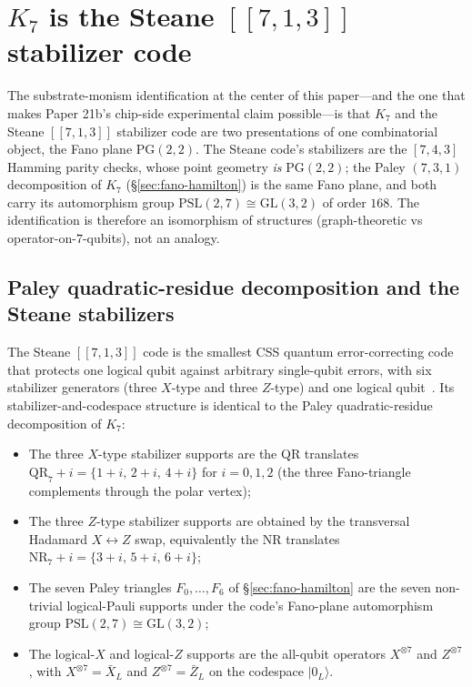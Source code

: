 \documentclass[11pt]{article}
\newcommand{\Klogical}{[[7, 1, 3]]}
\newcommand{\barX}{\bar X_L}
\newcommand{\barZ}{\bar Z_L}
\newcommand{\QR}{\mathrm{QR}}
\newcommand{\NR}{\mathrm{NR}}
\begin{document}
\section{$K_7$ is the Steane $\Klogical$ stabilizer code}
\label{sec:k7-steane}

The substrate-monism identification at the center of this paper---and the one that makes Paper 21b's chip-side experimental claim possible---is that $K_7$ and the Steane $\Klogical$ stabilizer code are two presentations of one combinatorial object, the Fano plane $\mathrm{PG}(2, 2)$.  The Steane code's stabilizers are the $[7, 4, 3]$ Hamming parity checks, whose point geometry \emph{is} $\mathrm{PG}(2, 2)$; the Paley $(7, 3, 1)$ decomposition of $K_7$ (\S\ref{sec:fano-hamilton}) is the same Fano plane, and both carry its automorphism group $\mathrm{PSL}(2, 7) \cong \mathrm{GL}(3, 2)$ of order $168$.  The identification is therefore an isomorphism of structures (graph-theoretic vs operator-on-$7$-qubits), not an analogy.

\subsection{Paley quadratic-residue decomposition and the Steane stabilizers}
\label{sec:paley-stabilizers}

The Steane $\Klogical$ code is the smallest CSS quantum error-correcting code that protects one logical qubit against arbitrary single-qubit errors, with six stabilizer generators (three $X$-type and three $Z$-type) and one logical qubit~\cite{Steane1996}.  Its stabilizer-and-codespace structure is identical to the Paley quadratic-residue decomposition of $K_7$:

\begin{itemize}
\item The three $X$-type stabilizer supports are the QR translates $\QR_7 + i = \{1 + i,\, 2 + i,\, 4 + i\}$ for $i = 0, 1, 2$ (the three Fano-triangle complements through the polar vertex);
\item The three $Z$-type stabilizer supports are obtained by the transversal Hadamard $X \leftrightarrow Z$ swap, equivalently the NR translates $\NR_7 + i = \{3 + i,\, 5 + i,\, 6 + i\}$;
\item The seven Paley triangles $F_0, \ldots, F_6$ of \S\ref{sec:fano-hamilton} are the seven non-trivial logical-Pauli supports under the code's Fano-plane automorphism group $\mathrm{PSL}(2, 7) \cong \mathrm{GL}(3, 2)$;
\item The logical-$X$ and logical-$Z$ supports are the all-qubit operators $X^{\otimes 7}$ and $Z^{\otimes 7}$, with $X^{\otimes 7} = \barX$ and $Z^{\otimes 7} = \barZ$ on the codespace $|0_L\rangle$.
\end{itemize}
\end{document}
